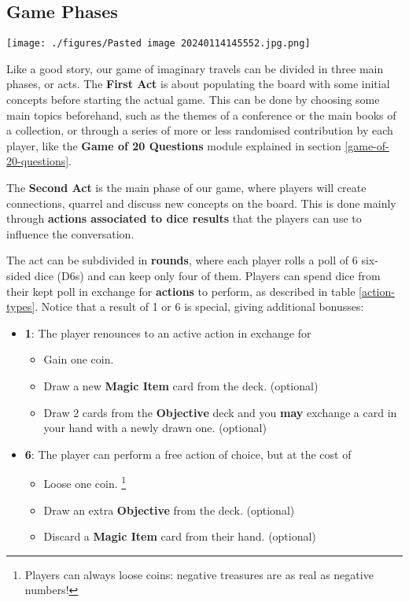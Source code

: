 \documentclass[12pt,a4paper]{book}
\theoremstyle{definition}
\begin{document}
\newpage

\subsection{Game Phases}

\begin{center}
\texttt{[image: ./figures/Pasted image 20240114145552.jpg.png]}
\end{center}

Like a good story, our game of imaginary travels can be divided in three main phases, or acts. The \textbf{First Act} is about populating the board with some initial concepts before starting the actual game. This can be done by choosing some main topics beforehand, such as the themes of a conference or the main books of a collection, or through a series of more or less randomised contribution by each player, like the \textbf{Game of 20 Questions} module explained in section \ref{game-of-20-questions}.

The \textbf{Second Act} is the main phase of our game, where players will create connections, quarrel and discuss new concepts on the board. This is done mainly through \textbf{actions associated to dice results} that the players can use to influence the conversation.

The act can be subdivided in \textbf{rounds}, where each player rolls a poll of 6 six-sided dice (D6s) and can keep only four of them. Players can spend dice from their kept poll in exchange for \textbf{actions} to perform, as described in table \ref{action-types}. Notice that a result of 1 or 6 is special, giving additional bonusses:

\begin{itemize}
\item \textbf{1}: The player renounces to an active action in exchange for 
	\begin{itemize}
	\item Gain one coin.
	\item Draw a new \textbf{Magic Item} card from the deck. (optional)
	\item Draw 2 cards from the \textbf{Objective} deck and you \textbf{may} exchange a card in your hand with a newly drawn one. (optional)   
	\end{itemize}
\item \textbf{6}: The player can perform a free action of choice, but at the cost of
	\begin{itemize}
	\item Loose one coin. \footnote{Players can always loose coins: negative treasures are as real as negative numbers!}
	\item Draw an extra \textbf{Objective} from the deck. (optional)
	\item Discard a \textbf{Magic Item} card from their hand. (optional)
	\end{itemize}
\end{itemize}
\end{document}
